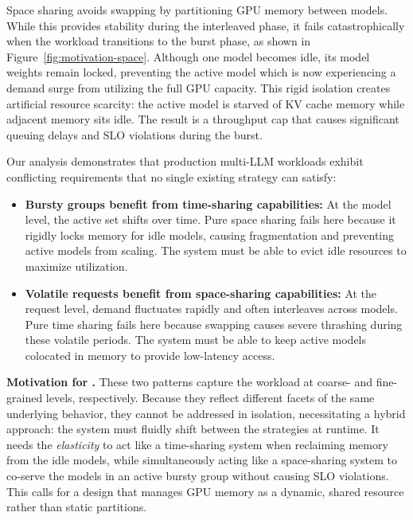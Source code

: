 Space sharing avoids swapping by partitioning GPU memory between models.
While this provides stability during the interleaved phase, it fails catastrophically when the workload transitions to the burst phase, as shown in Figure~\ref{fig:motivation-space}.
Although one model becomes idle, its model weights remain locked, preventing the active model which is now experiencing a demand surge from utilizing the full GPU capacity.
This rigid isolation creates artificial resource scarcity: the active model is starved of KV cache memory while adjacent memory sits idle.
The result is a throughput cap that causes significant queuing delays and SLO violations during the burst.

 \label{sec:motivation:takeaway}

Our analysis demonstrates that production multi-LLM workloads exhibit conflicting requirements that no single existing strategy can satisfy: 
\begin{itemize}[leftmargin=1em,nosep]
\item \textbf{Bursty groups benefit from time-sharing capabilities:} At the model level, the active set shifts over time. Pure space sharing fails here because it rigidly locks memory for idle models, causing fragmentation and preventing active models from scaling. The system must be able to evict idle resources to maximize utilization. 
\item \textbf{Volatile requests benefit from space-sharing capabilities:} At the request level, demand fluctuates rapidly and often interleaves across models. Pure time sharing fails here because swapping causes severe thrashing during these volatile periods. The system must be able to keep active models colocated in memory to provide low-latency access. \end{itemize}

\noindent \textbf{Motivation for \tool.}  These two patterns capture the workload at coarse- and fine-grained levels, respectively. Because they reflect different facets of the same underlying behavior, they cannot be addressed in isolation, necessitating a hybrid approach: the system must fluidly shift between the strategies at runtime. It needs the \textit{elasticity} to act like a time-sharing system when reclaiming memory from the idle models, while simultaneously acting like a space-sharing system to co-serve the models in an active bursty group without causing SLO violations. This calls for a design that manages GPU memory as a dynamic, shared resource rather than static partitions.